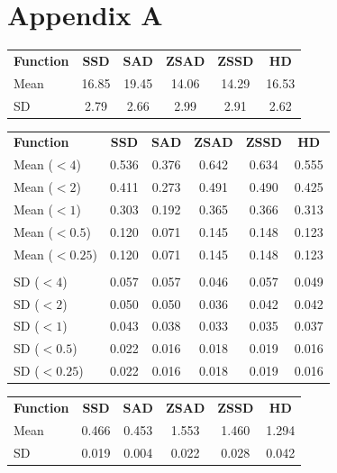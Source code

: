 \documentclass[conference]{IEEEtran}
\begin{document}
\section*{Appendix A}
\begin{center}
    \begin{tabular}{l c c c c c}
        \textbf{Function} & \textbf{SSD} & \textbf{SAD} & \textbf{ZSAD} & \textbf{ZSSD} & \textbf{HD} \\ [0.5ex] 
        Mean & 16.85 & 19.45 & 14.06 & 14.29 & 16.53 \\
        SD & 2.79 & 2.66 & 2.99 & 2.91 & 2.62
    \end{tabular}
\end{center}
\begin{center}
    \begin{tabular}{l c c c c c}
        \textbf{Function} & \textbf{SSD} & \textbf{SAD} & \textbf{ZSAD} & \textbf{ZSSD} & \textbf{HD} \\ [0.5ex] 
        Mean ($<4$) & 0.536 & 0.376 & 0.642 & 0.634 & 0.555 \\
        Mean ($<2$) & 0.411 & 0.273 & 0.491 & 0.490 & 0.425 \\
        Mean ($<1$) & 0.303 & 0.192 & 0.365 & 0.366 & 0.313 \\
        Mean ($<0.5$) & 0.120 & 0.071 & 0.145 & 0.148 & 0.123 \\
        Mean ($<0.25$) & 0.120 & 0.071 & 0.145 & 0.148 & 0.123 \\
        & & & & & \\
        SD ($<4$) & 0.057 & 0.057 & 0.046 & 0.057 & 0.049 \\
        SD ($<2$) & 0.050 & 0.050 & 0.036 & 0.042 & 0.042 \\
        SD ($<1$) & 0.043 & 0.038 & 0.033 &  0.035 & 0.037 \\
        SD ($<0.5$) & 0.022 & 0.016 & 0.018 & 0.019 & 0.016 \\
        SD ($<0.25$) & 0.022 & 0.016 & 0.018 & 0.019 & 0.016 \\
    \end{tabular}
\end{center}
\begin{center}
    \begin{tabular}{l c c c c c}
        \textbf{Function} & \textbf{SSD} & \textbf{SAD} & \textbf{ZSAD} & \textbf{ZSSD} & \textbf{HD} \\ [0.5ex] 
        Mean & 0.466 & 0.453 & 1.553 & 1.460 & 1.294 \\
        SD & 0.019 & 0.004 & 0.022 & 0.028 & 0.042
    \end{tabular}
\end{center}
\end{document}
